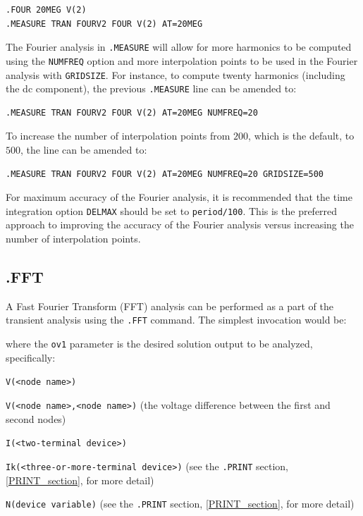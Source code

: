 \begin{verbatim}
.FOUR 20MEG V(2)
.MEASURE TRAN FOURV2 FOUR V(2) AT=20MEG
\end{verbatim}


The Fourier analysis in \texttt{.MEASURE} will allow for more harmonics
to be computed using the \texttt{NUMFREQ} option and more interpolation points
to be used in the Fourier analysis with \texttt{GRIDSIZE}.  
For instance, to compute twenty harmonics
(including the dc component), the previous \texttt{.MEASURE} line can be amended to:

\begin{verbatim}
.MEASURE TRAN FOURV2 FOUR V(2) AT=20MEG NUMFREQ=20
\end{verbatim}

To increase the number of interpolation points from $200$, which is the default,
to $500$, the line can be amended to:

\begin{verbatim}
.MEASURE TRAN FOURV2 FOUR V(2) AT=20MEG NUMFREQ=20 GRIDSIZE=500
\end{verbatim}

For maximum accuracy of the Fourier analysis, it is recommended that 
the time integration option \texttt{DELMAX}
should be set to \texttt{period/100}.  This is the preferred approach to
improving the accuracy of the Fourier analysis versus increasing the number of
interpolation points.

\subsection{.FFT}
A Fast Fourier Transform (FFT) analysis can be performed as a part of the
transient analysis using the \texttt{.FFT} command.  The simplest
invocation would be:

where the \texttt{ov1} parameter is the desired solution output to be analyzed, specifically:
\begin{XyceItemize}
\item \texttt{V(<node name>)}
\item \texttt{V(<node name>,<node name>)} (the voltage difference between the first and second nodes)
\item \texttt{I(<two-terminal device>)}
\item \texttt{Ik(<three-or-more-terminal device>)} (see the \texttt{.PRINT} section, \ref{PRINT_section}, for more detail)
\item \texttt{N(device variable)} (see the \texttt{.PRINT} section, \ref{PRINT_section}, for more detail)
\end{XyceItemize}

